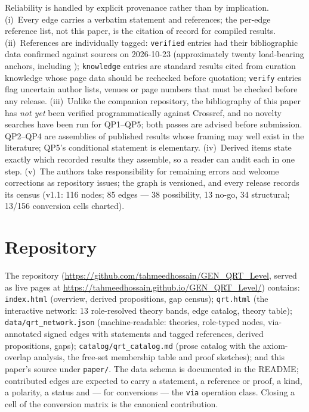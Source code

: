 \documentclass[11pt,a4paper]{article}
\theoremstyle{definition}
\begin{document}
Reliability is handled by explicit provenance rather than by implication.
(i)~Every edge carries a verbatim statement and references; the per-edge
reference list, not this paper, is the citation of record for compiled
results. (ii)~References are individually tagged: \texttt{verified} entries
had their bibliographic data confirmed against sources on 2026-10-23
(approximately twenty load-bearing anchors, including
\cite{streltsov2015,marvianspekkens2016,msz2016,faist2015,lostaglio2015prx,
marvian2020,lamiregula2023,hayashiyamasaki2024,lami2024,wolfe2020,uola2015,
amaral2018,santos2024,wu2021prl,wu2021pra,bcz2020,takagi2019,takagiregula2019,
piani2011,streltsov2018njp,datta2023}); \texttt{knowledge} entries are
standard results cited from curation knowledge whose page data should be
rechecked before quotation; \texttt{verify} entries flag uncertain author
lists, venues or page numbers that must be checked before any release.
(iii)~Unlike the companion repository, the bibliography of this paper has
\emph{not yet} been verified programmatically against Crossref, and no
novelty searches have been run for QP1--QP5; both passes are advised before
submission. QP2--QP4 are assemblies of published results whose framing may
well exist in the literature; QP5's conditional statement is elementary.
(iv)~Derived items state exactly which recorded results they assemble, so a
reader can audit each in one step. (v)~The authors take responsibility for
remaining errors and welcome corrections as repository issues; the graph is
versioned, and every release records its census (v1.1: 116 nodes; 85 edges
--- 38 possibility, 13 no-go, 34 structural; 13/156 conversion cells
charted).

\section{Repository}\label{sec:repo}

The repository (\url{https://github.com/tahmeedhossain/GEN_QRT_Level},
served as live pages at
\url{https://tahmeedhossain.github.io/GEN_QRT_Level/}) contains:
\texttt{index.html} (overview, derived propositions, gap census);
\texttt{qrt.html} (the interactive network: 13 role-resolved theory bands,
edge catalog, theory table); \texttt{data/qrt\_network.json}
(machine-readable: theories, role-typed nodes, via-annotated signed edges
with statements and tagged references, derived propositions, gaps);
\texttt{catalog/qrt\_catalog.md} (prose catalog with the axiom-overlap
analysis, the free-set membership table and proof sketches); and this
paper's source under \texttt{paper/}. The data schema is documented in the
README; contributed edges are expected to carry a statement, a reference or
proof, a kind, a polarity, a status and --- for conversions --- the
\texttt{via} operation class. Closing a cell of the conversion matrix is the
canonical contribution.
\end{document}
